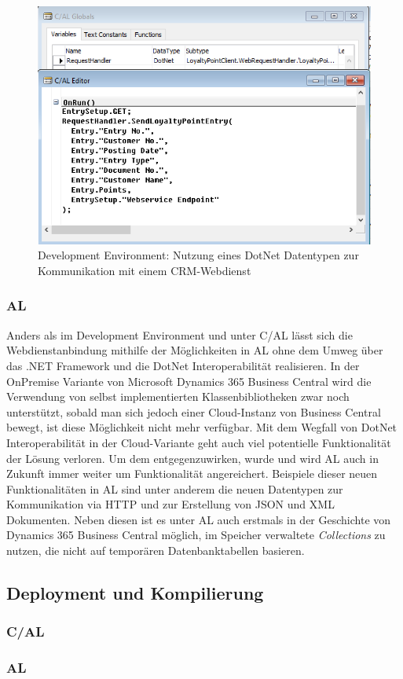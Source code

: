 \begin{figure}[h]
	\centering
	\includegraphics[width=130mm]{images/dotnetVariable}
	\caption{Development Environment: Nutzung eines DotNet Datentypen zur Kommunikation mit einem CRM-Webdienst}
	\label{fig:dotnetVariable}
\end{figure}
\pagebreak

\subsubsection{AL}
Anders als im Development Environment und unter C/AL lässt sich die Webdienstanbindung mithilfe der Möglichkeiten in AL ohne dem Umweg über das .NET Framework und die DotNet Interoperabilität realisieren. In der OnPremise Variante von Microsoft Dynamics 365 Business Central wird die Verwendung von selbst implementierten Klassenbibliotheken zwar noch unterstützt, sobald man sich jedoch einer Cloud-Instanz von Business Central bewegt, ist diese Möglichkeit nicht mehr verfügbar. Mit dem Wegfall von DotNet Interoperabilität in der Cloud-Variante geht auch viel potentielle Funktionalität der Lösung verloren. Um dem entgegenzuwirken, wurde und wird AL auch in Zukunft immer weiter um Funktionalität angereichert. Beispiele dieser neuen Funktionalitäten in AL sind unter anderem die neuen Datentypen zur Kommunikation via HTTP und zur Erstellung von JSON und XML Dokumenten. Neben diesen ist es unter AL auch erstmals in der Geschichte von Dynamics 365 Business Central möglich, im Speicher verwaltete \textit{Collections} zu nutzen, die nicht auf temporären Datenbanktabellen basieren.


\subsection{Deployment und Kompilierung}
\subsubsection{C/AL}
\subsubsection{AL}
















